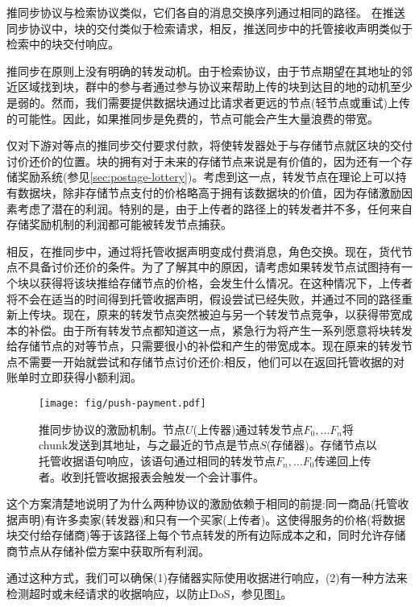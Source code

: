 推同步协议与检索协议类似，它们各自的消息交换序列通过相同的路径。
在推送同步协议中，块的交付类似于检索请求，相反，推送同步中的托管接收声明类似于检索中的块交付响应。

推同步在原则上没有明确的转发动机。由于检索协议，由于节点期望在其地址的邻近区域找到块，群中的参与者通过参与协议来帮助上传的块到达目的地的动机至少是弱的。然而，我们需要提供数据块通过比请求者更远的节点(轻节点或重试)上传的可能性。因此，如果推同步是免费的，节点可能会产生大量浪费的带宽。

仅对下游对等点的推同步交付要求付款，将使转发器处于与存储节点就区块的交付讨价还价的位置。块的拥有对于未来的存储节点来说是有价值的，因为还有一个存储奖励系统(参见\ref{sec:postage-lottery})。考虑到这一点，转发节点在理论上可以持有数据块，除非存储节点支付的价格略高于拥有该数据块的价值，因为存储激励因素考虑了潜在的利润。特别的是，由于上传者的路径上的转发者并不多，任何来自存储奖励机制的利润都可能被转发节点捕获。

相反，在推同步中，通过将托管收据声明变成付费消息，角色交换。现在，货代节点不具备讨价还价的条件。为了了解其中的原因，请考虑如果转发节点试图持有一个块以获得将该块推给存储节点的价格，会发生什么情况。在这种情况下，上传者将不会在适当的时间得到托管收据声明，假设尝试已经失败，并通过不同的路径重新上传块。现在，原来的转发节点突然被迫与另一个转发节点竞争，以获得带宽成本的补偿。由于所有转发节点都知道这一点，紧急行为将产生一系列愿意将块转发给存储节点的对等节点，只需要很小的补偿和产生的带宽成本。现在原来的转发节点不需要一开始就尝试和存储节点讨价还价:相反，他们可以在返回托管收据的对账单时立即获得小额利润。 


\begin{figure}[htbp]
\centering
\texttt{[image: fig/push-payment.pdf]}
\caption[推同步协议的激励机制\statusgreen]{推同步协议的激励机制。节点$U$(上传器)通过转发节点$F_0, \ldots F_n$将chunk发送到其地址，与之最近的节点是节点$S$(存储器)。存储节点以托管收据语句响应，该语句通过相同的转发节点$F_n, \ldots F_0$传递回上传者。收到托管收据报表会触发一个会计事件。}
\label{fig:syncing-swap}
\end{figure}

这个方案清楚地说明了为什么两种协议的激励依赖于相同的前提:同一商品(托管收据声明)有许多卖家(转发器)和只有一个买家(上传者)。这使得服务的价格(将数据块交付给存储商)等于该路径上每个节点转发的所有边际成本之和，同时允许存储商节点从存储补偿方案中获取所有利润。

通过这种方式，我们可以确保(1)存储器实际使用收据进行响应，(2)有一种方法来检测超时或未经请求的收据响应，以防止DoS，参见图\ref{fig:syncing-swap}。

